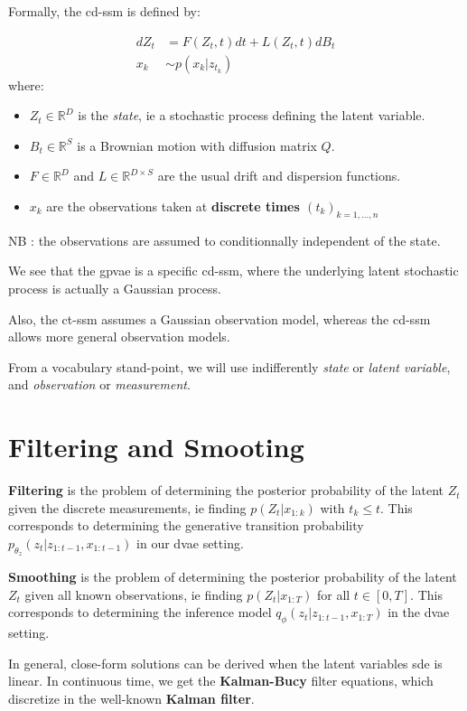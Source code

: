 Formally, the \gls{cd-ssm} is defined by:

\begin{tcolorbox}[colback=blue!5!white,colframe=black!75!black,title=Continuous-Discrete State Space model]
    \begin{align}
        dZ_t &= F(Z_t, t)dt + L(Z_t,t) dB_t \\
        x_k &\sim p(x_k \vert z_{t_k})
    \end{align}
    where:
    \begin{itemize}
        \item $Z_t \in \mathbb{R}^{D}$ is the \textit{state}, ie a stochastic process defining the latent variable.
        \item $B_t \in \mathbb{R}^{S}$ is a Brownian motion with diffusion matrix $Q$.
        \item $F \in \mathbb{R}^{D}$ and $L \in \mathbb{R}^{D \times S}$ are the usual drift and dispersion functions.
        \item $x_k$ are the observations taken at \textbf{discrete times $(t_k)_{k=1,...,n}$}
    \end{itemize}
    NB : the observations are assumed to conditionnally independent of the state.
\end{tcolorbox}

We see that the \gls{gpvae} is a specific \gls{cd-ssm}, where the underlying latent stochastic process 
is actually a Gaussian process.

Also, the \gls{ct-ssm} assumes a Gaussian observation model, whereas the \gls{cd-ssm} allows more general 
observation models.

From a vocabulary stand-point, we will use indifferently \textit{state} or \textit{latent variable}, and 
\textit{observation} or \textit{measurement}.

\section{Filtering and Smooting}

\textbf{Filtering} is the problem of determining the posterior probability of the latent $Z_t$ given the 
discrete measurements, ie finding $p(Z_t \vert x_{1:k})$ with $t_k \leq t$. This corresponds to 
determining the generative transition probability $p_{\theta_z}(z_t \vert z_{1:t-1}, x_{1:t-1})$ in our 
\gls{dvae} setting.

\textbf{Smoothing} is the problem of determining the posterior probability of the latent $Z_t$ given 
all known observations, ie finding $p(Z_t \vert x_{1:T})$ for all $t \in [0,T]$. This corresponds to 
determining the inference model $q_{\phi}(z_t \vert z_{1:t-1}, x_{1:T})$ in the \gls{dvae} setting.

In general, close-form solutions can be derived when the latent variables \gls{sde} is linear. In continuous 
time, we get the \textbf{Kalman-Bucy} filter equations, which discretize in the well-known \textbf{Kalman filter}.

\begin{tcolorbox}[colback=blue!5!white,colframe=black!75!black,title=Kalman-Bucy filter]
    
\end{tcolorbox}